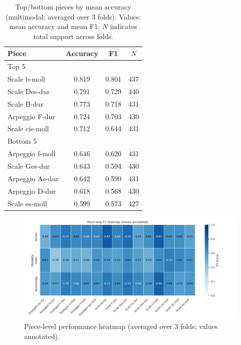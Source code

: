 \documentclass[sigconf,review,anonymous]{acmart}
\begin{document}
\begin{table}[t]
  \centering
  \caption{Top/bottom pieces by mean accuracy (multimodal; averaged over 3 folds). Values: mean accuracy and mean F1; $N$ indicates total support across folds.}
  \label{tab:piece_accuracy}
  \begin{tabular}{lccc}
    \hline
    Piece & Accuracy & F1 & $N$ \\
    \hline
    \multicolumn{4}{l}{Top 5} \\
    Scale b-moll & 0.819 & 0.801 & 437 \\
    Scale Des-dur & 0.791 & 0.729 & 440 \\
    Scale B-dur & 0.773 & 0.718 & 431 \\
    Arpeggio F-dur & 0.724 & 0.703 & 430 \\
    Scale cis-moll & 0.712 & 0.644 & 431 \\
    \hline
    \multicolumn{4}{l}{Bottom 5} \\
    Arpeggio f-moll & 0.646 & 0.620 & 431 \\
    Scale Ges-dur & 0.643 & 0.594 & 430 \\
    Arpeggio As-dur & 0.642 & 0.590 & 431 \\
    Arpeggio D-dur & 0.618 & 0.568 & 430 \\
    Scale es-moll & 0.599 & 0.573 & 427 \\
    \hline
  \end{tabular}
\end{table}

\begin{figure}[t]
  \centering
  \includegraphics[width=1.0\linewidth]{figures/piece_f1_heatmap.png}
  \caption{Piece-level performance heatmap (averaged over 3 folds; values annotated).}
  \label{fig:piece_heatmap}
\end{figure}
\end{document}
